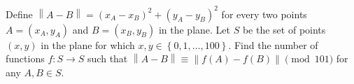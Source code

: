 Define $\left\lVert A-B \right\rVert = (x_A-x_B)^2+(y_A-y_B)^2$ for every two points $A = (x_A, y_A)$ and $B = (x_B, y_B)$ in the plane.
Let $S$ be the set of points $(x,y)$ in the plane for which $x,y \in \left\{ 0,1,\dots,100 \right\}$.
Find the number of functions $f : S \to S$ such that $\left\lVert A-B \right\rVert \equiv \left\lVert f(A)-f(B) \right\rVert \pmod{101}$ for any $A, B \in S$.
